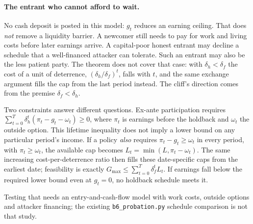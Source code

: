 \documentclass[11pt,a4paper]{article}
\theoremstyle{definition}
\begin{document}
\paragraph{The entrant who cannot afford to wait.}
\pdprobationcapacity
No cash deposit is posted in this model: $g_t$ reduces an earning ceiling.
That does \emph{not} remove a liquidity barrier. A newcomer still needs to pay
for work and living costs before later earnings arrive. A capital-poor honest
entrant may decline a schedule that a well-financed attacker can tolerate.
Such an entrant may also be the less patient party. The theorem does not
cover that case: with $\delta_h<\delta_f$ the cost of a unit of deterrence,
$(\delta_h/\delta_f)^t$, falls with $t$, and the same exchange argument fills
the cap from the last period instead. The cliff's direction comes from the
premise $\delta_f<\delta_h$.

Two constraints answer different questions. Ex-ante participation requires
$\sum_{t=0}^T\delta_h^t(\pi_t-g_t-\omega_t)\ge0$, where $\pi_t$ is earnings before
the holdback and $\omega_t$ the outside option. This lifetime inequality does not
imply a lower bound on any particular period's income. If a policy \emph{also} requires
$\pi_t-g_t\ge \omega_t$ in every period, with $\pi_t\ge \omega_t$, the available cap
becomes $L_t=\min(L,\pi_t-\omega_t)$. The same increasing cost-per-deterrence ratio
then fills these date-specific caps from the earliest date; feasibility is
exactly $G_{\max}\le\sum_{t=0}^T\delta_f^tL_t$. If earnings fall below the
required lower bound even at $g_t=0$, no holdback schedule meets it.

Testing that needs an entry-and-cash-flow model with work costs, outside
options and attacker financing; the existing \texttt{b6\_probation.py}
schedule comparison is not that study.


\end{document}
